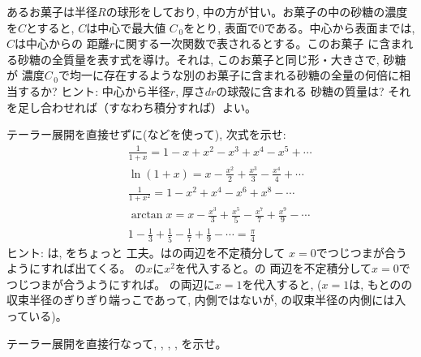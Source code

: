 \begin{exq}\label{q:integ_okashi} あるお菓子は半径$R$の球形をしており, 
中の方が甘い。お菓子の中の砂糖の濃度を$C$とすると, $C$は中心で最大値
$C_{\,0}$をとり, 表面で0である。中心から表面までは, $C$は中心からの
距離$r$に関する一次関数で表されるとする。このお菓子
に含まれる砂糖の全質量を表す式を導け。それは, このお菓子と同じ形・大きさで, 砂糖が
濃度$C_{\,0}$で均一に存在するような別のお菓子に含まれる砂糖の全量の何倍に相当するか? 
ヒント: 中心から半径$r$, 厚さ$dr$の球殻に含まれる
砂糖の質量は? それを足し合わせれば（すなわち積分すれば）よい。
\end{exq}
\mv

\begin{exq}\label{q:univ_Taylor5} テーラー展開を直接せずに(などを使って), 次式を示せ:
\begin{eqnarray}
&&\frac{1}{1+x}=1-x+x^2-x^3+x^4-x^5+\cdots\label{eq:univ_Taylor51}\\
&&\ln (1+x)=x-\frac{x^2}{2}+\frac{x^3}{3}-\frac{x^4}{4}+\cdots\label{eq:univ_Taylor52}\\
&&\frac{1}{1+x^2}=1-x^2+x^4-x^6+x^8-\cdots\label{eq:univ_Taylor53}\\
&&\arctan x=x-\frac{x^3}{3}+\frac{x^5}{5}-\frac{x^7}{7}+\frac{x^9}{9}-\cdots\label{eq:univ_Taylor54}\\
&&1-\frac{1}{3}+\frac{1}{5}-\frac{1}{7}+\frac{1}{9}-\cdots=\frac{\pi}{4}\label{eq:univ_Taylor55}
\end{eqnarray}
{\small ヒント: は, をちょっと
工夫。はの両辺を不定積分して
$x=0$でつじつまが合うようにすれば出てくる。
の$x$に$x^2$を代入すると。の
両辺を不定積分して$x=0$でつじつまが合うようにすれば。
の両辺に$x=1$を代入すると, 
($x=1$は, もとのの収束半径のぎりぎり端っこであって, 
内側ではないが, の収束半径の内側には入っている)。}
\end{exq}
\mv

\begin{exq}\label{q:univ_Taylor7} テーラー展開を直接行なって, , 
, , 
を示せ。\end{exq}
\mv


